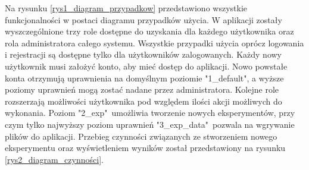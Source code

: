 Na rysunku \ref{rys1_diagram_przypadkow} przedstawiono wszystkie funkcjonalności w postaci diagramu przypadków użycia. W aplikacji zostały wyszczególnione trzy role dostępne do uzyskania dla każdego użytkownika oraz rola administratora całego systemu. Wszystkie przypadki użycia oprócz logowania i rejestracji są dostępne tylko dla użytkowników zalogowanych. Każdy nowy użytkownik musi założyć konto, aby mieć dostęp do aplikacji. Nowo powstałe konta otrzymują uprawnienia na domyślnym poziomie "1\_default", a wyższe poziomy uprawnień mogą zostać nadane przez administratora. Kolejne role rozszerzają możliwości użytkownika pod względem ilości akcji możliwych do wykonania. Poziom "2\_exp"\ umożliwia tworzenie nowych eksperymentów, przy czym tylko najwyższy poziom uprawnień "3\_exp\_data"\  pozwala na wgrywanie plików do aplikacji. Przebieg czynności związanych ze stworzeniem nowego eksperymentu oraz wyświetleniem wyników został przedstawiony na rysunku \ref{rys2_diagram_czynności}. 



